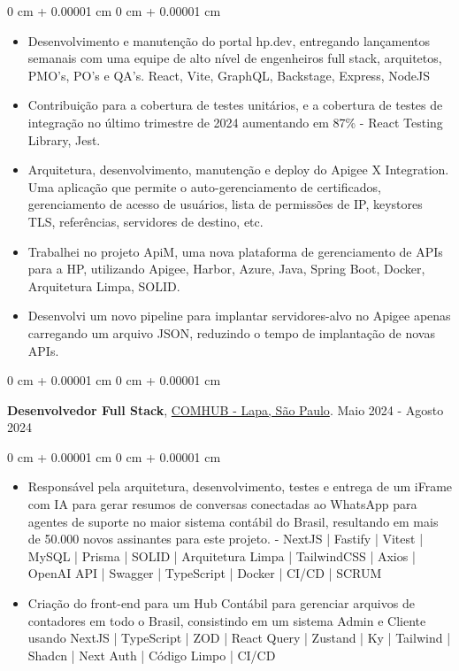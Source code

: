 \documentclass[10pt, letterpaper]{article}
\newenvironment{highlights}{ \begin{itemize}[ topsep=0.10 cm, parsep=0.10 cm, partopsep=0pt,
itemsep=0pt, leftmargin=0 cm + 10pt ] }{ \end{itemize} } %
\newenvironment{onecolentry}{ \begin{adjustwidth}{ 0 cm + 0.00001 cm }{ 0 cm + 0.00001 cm }
}{ \end{adjustwidth} } %
\newenvironment{twocolentry}[2][]{ \onecolentry \def\secondColumn{#2} \setcolumnwidth{\fill, 4.5 cm}
\begin{paracol}{2} }{ \switchcolumn \raggedleft \secondColumn \end{paracol}
\endonecolentry } %
\let\hrefWithoutArrow\href
\begin{document}
    \vspace{0.10 cm}
    \begin{onecolentry}
        \begin{highlights}
            \item Desenvolvimento e manutenção do portal hp.dev, entregando lançamentos semanais com uma equipe de alto nível de engenheiros full stack, arquitetos, PMO's, PO's e QA's. React, Vite, GraphQL, Backstage, Express, NodeJS
            \item Contribuição para a cobertura de testes unitários, e a cobertura de testes de integração no último trimestre de 2024 aumentando em 87\% - React Testing Library, Jest.
            \item Arquitetura, desenvolvimento, manutenção e deploy do Apigee X Integration. Uma aplicação que permite o auto-gerenciamento de certificados, gerenciamento de acesso de usuários, lista de permissões de IP, keystores TLS, referências, servidores de destino, etc.
            \item Trabalhei no projeto ApiM, uma nova plataforma de gerenciamento de APIs para a HP, utilizando Apigee, Harbor, Azure, Java, Spring Boot, Docker, Arquitetura Limpa, SOLID.
            \item Desenvolvi um novo pipeline para implantar servidores-alvo no Apigee apenas carregando um arquivo JSON, reduzindo o tempo de implantação de novas APIs.
        \end{highlights}
    \end{onecolentry}
    
    \vspace{0.2 cm}
    
    \begin{twocolentry}
        { Maio 2024 - Agosto 2024 } \textbf{Desenvolvedor Full Stack},  {\hrefWithoutArrow{https://comhub.com.br/}{COMHUB - Lapa, São Paulo}}.
    \end{twocolentry}
    
    \vspace{0.10 cm}
    \begin{onecolentry}
        \begin{highlights}
            \item Responsável pela arquitetura, desenvolvimento, testes e entrega de um iFrame com IA para gerar resumos de conversas conectadas ao WhatsApp para agentes de suporte no maior sistema contábil do Brasil, resultando em mais de 50.000 novos assinantes para este projeto. - NextJS | Fastify | Vitest | MySQL | Prisma | SOLID | Arquitetura Limpa | TailwindCSS | Axios | OpenAI API | Swagger | TypeScript | Docker | CI/CD | SCRUM
            \item Criação do front-end para um Hub Contábil para gerenciar arquivos de contadores em todo o Brasil, consistindo em um sistema Admin e Cliente usando NextJS | TypeScript | ZOD | React Query | Zustand | Ky | Tailwind | Shadcn | Next Auth | Código Limpo | CI/CD
        \end{highlights}
    \end{onecolentry}
    
\end{document}
